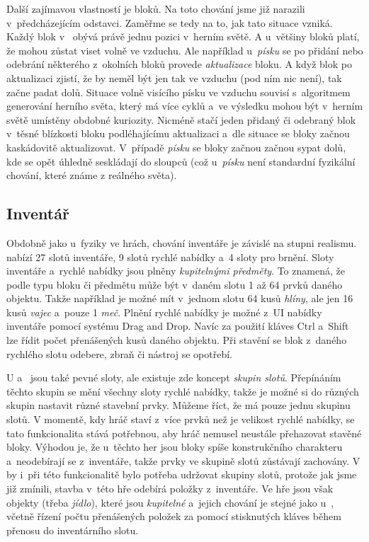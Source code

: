 Další zajímavou vlastností je  bloků. Na toto chování jsme již narazili v~předcházejícím odstavci. Zaměřme se tedy na to, jak tato situace vzniká. Každý blok v~ obývá právě jednu pozici v~herním světě. A u~většiny bloků platí, že mohou zůstat viset volně ve vzduchu. Ale například u~\textit{písku} se po přidání nebo odebrání některého z~okolních bloků provede \textit{aktualizace} bloku. A když blok po aktualizaci zjistí, že by neměl být jen tak ve vzduchu (pod ním nic není), tak začne padat dolů. Situace volně visícího písku ve vzduchu souvisí s~algoritmem generování herního světa, který má více cyklů a~ve výsledku mohou být v~herním světě umístěny obdobné kuriozity. Nicméně stačí jeden přidaný či odebraný blok v~těsné blízkosti bloku podléhajícímu aktualizaci a~dle situace se bloky začnou kaskádovitě aktualizovat. V~případě \textit{písku} se bloky začnou začnou sypat dolů, kde se opět úhledně seskládají do sloupců (což u~\textit{písku} není standardní fyzikální chování, které známe z reálného světa).


\subsection{Inventář}
\label{subsec:inventory}

Obdobně jako u~fyziky ve hrách, chování inventáře je závislé na stupni realismu. \MC{} nabízí 27 slotů inventáře, 9 slotů rychlé nabídky a~4 sloty pro brnění. Sloty inventáře a~rychlé nabídky jsou plněny \textit{kupitelnými předměty}. To znamená, že podle typu bloku či předmětu může být v~daném slotu 1 až 64 prvků daného objektu. Takže například je možné mít v~jednom slotu 64 kusů \textit{hlíny}, ale jen 16 kusů \textit{vajec} a~pouze 1 \textit{meč}. Plnění rychlé nabídky je možné z~UI nabídky inventáře pomocí systému Drag and Drop. Navíc za použití kláves Ctrl a~Shift lze řídit počet přenášených kusů daného objektu. Při stavění se blok z~daného rychlého slotu odebere, zbraň či nástroj se opotřebí.

U \ME{} a~\SE{} jsou také pevné sloty, ale existuje zde koncept \textit{skupin slotů}. Přepínáním těchto skupin se mění všechny sloty rychlé nabídky, takže je možné si do různých skupin nastavit různé stavební prvky. Můžeme říct, že \MC{} má pouze jednu skupinu slotů. V momentě, kdy hráč staví z~více prvků než je velikost rychlé nabídky, se tato funkcionalita stává potřebnou, aby hráč nemusel neustále přehazovat stavěné bloky. Výhodou je, že u~těchto her jsou bloky spíše konstrukčního charakteru a~neodebírají se z~inventáře, takže prvky ve skupině slotů zůstávají zachovány. V  by i~při této funkcionalitě bylo potřeba udržovat skupiny slotů, protože jak jsme již zmínili, stavba v~této hře odebírá položky z~inventáře. Ve hře jsou však objekty (třeba \textit{jídlo}), které jsou \textit{kupitelné} a~jejich chování je stejné jako u~, včetně řízení počtu přenášených položek za pomocí stisknutých kláves během přenosu do inventárního slotu.

